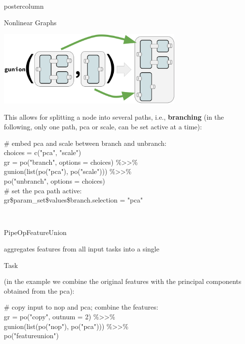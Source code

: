 \documentclass{beamer}
\newcommand{\codeinline}[1]{\begin{codeboxinline}#1\end{codeboxinline}}
\begin{document}
\begin{frame}[fragile]{}
\begin{columns}
\begin{column}{.245\textwidth}
\begin{beamercolorbox}[center]{postercolumn}
\begin{minipage}{.98\textwidth}
{\begin{myblock}{Nonlinear Graphs}
              \begin{center}
                \includegraphics[width=0.7\textwidth]{img/gunion.pdf}
              \end{center}
              This allows for splitting a node into several paths, i.e., \textbf{branching} (in the following, only one path, pca or scale, can be set active at a time):
              \begin{codeboxexample}
						    {\footnotesize
                  \# embed pca and scale between branch and unbranch:\\
                  choices = c("pca", "scale")\\
                  gr = po("branch", options = choices) \%>{}>\%\\
                  \hspace*{1ex} gunion(list(po("pca"), po("scale"))) \%>{}>\%\\
                  \hspace*{1ex} po("unbranch", options = choices)\\
                  \# set the pca path active:\\
                  gr\$param\_set\$values\$branch.selection = "pca"}
					      \end{codeboxexample}
              \ \\
              \codeinline{PipeOpFeatureUnion} aggregates features from all input tasks into a single \codeinline{Task} (in the example we combine the original features with the principal components obtained from the pca):
              \begin{codeboxexample}
						    {\footnotesize
                  \# copy input to nop and pca; combine the features:\\
                  gr = po("copy", outnum = 2) \%>{}>\%\\
                  \hspace*{1ex} gunion(list(po("nop"), po("pca"))) \%>{}>\%\\
                  \hspace*{1ex} po("featureunion")}
              \end{codeboxexample}

\end{myblock}}
\end{minipage}
\end{beamercolorbox}
\end{column}
\end{columns}
\end{frame}
\end{document}
